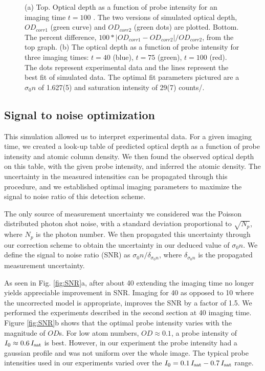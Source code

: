 \documentclass[12pt]{iopart}
\begin{document}
\begin{figure}
\caption{(a) Top. Optical depth as a function of probe intensity for an imaging time $t=100$ \us. The two versions of simulated optical depth, $OD_{corr1}$ (green curve) and $OD_{corr2}$ (green dots) are plotted. Bottom. The percent difference, $100*|OD_{corr1}-OD_{corr2}|/OD_{corr2}$, from the top graph. (b) The optical depth as a function of probe intensity for three imaging times: $t=40$\us{} (blue),  $t=75$\us{} (green),  $t=100$\us{} (red). The dots represent experimental data and the lines represent the best fit of simulated data. The optimal fit parameters pictured are a $\sigma_0 n$ of 1.627(5) and saturation intensity of 29(7) counts/\us{}.  }  
\label{fig:compareModelsAndIsat}
\end{figure}

\subsection{Signal to noise optimization}
This simulation allowed us to interpret experimental data. For a given imaging time, we created a look-up table of predicted optical depth as a function of probe intensity and atomic column density. We then found the observed optical depth on this table, with the given probe intensity, and inferred the atomic density. The uncertainty in the measured intensities can be propagated through this procedure, and we established optimal imaging parameters to maximize the signal to noise ratio of this detection scheme. 
\par The only source of measurement uncertainty we considered was the Poisson distributed photon shot noise, with a standard deviation proportional to $\sqrt{N_p}$, where $N_p$ is the photon number. We then propagated this uncertainty through our correction scheme to obtain the uncertainty in our deduced value of $\sigma_0 n$. We define the signal to noise ratio (SNR) as $\sigma_0 n/\delta_{\sigma_0 n}$, where $ \delta_{\sigma_0 n}$ is the propagated measurement uncertainty.
\par As seen in Fig. \ref{fig:SNR}a, after about 40 \us{} extending the imaging time no longer yields appreciable improvement in SNR. Imaging for 40 \us{} as opposed to 10 \us{} where the uncorrected model is appropriate, improves the SNR by a factor of  1.5. We performed the experiments described in the second section at 40 \us{} imaging time. Figure \ref{fig:SNR}b shows that the optimal probe intensity varies with the magnitude of $OD$s. For low atom numbers, $OD\approx0.1$, a probe intensity of $I_0\approx0.6\,I_{\rm{sat}}$ is best. However, in our experiment the probe intensity had a gaussian profile and was not uniform over the whole image.  The typical probe intensities used in our experiments varied over the $I_0=0.1\,I_{\rm{sat}}-0.7\,I_{\rm{sat}}$  range.
\end{document}
